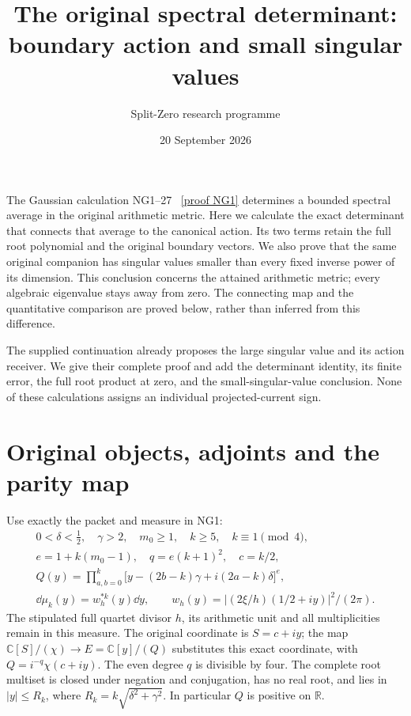 \documentclass[11pt]{article}
\title{The original spectral determinant:\\boundary action and small singular values}
\author{Split-Zero research programme}\date{20 September 2026}
\newcommand{\R}{\mathbb R}\newcommand{\C}{\mathbb C}
\begin{document}
\maketitle

The Gaussian calculation NG1--27 \cite{NG}%
~\href{https://github.com/KokunoYumeto/zeta-function-research-reader/blob/5992ad50c0f2a06921f1fcaded7b4e38097c0739/workbenches/splitzero-tandem/continuations/20260920-original-kernel-mixed-determinants/providers/GAUSSIAN_ARITHMETIC_RETURN.tex\#L31}{[proof NG1]}%
{} determines a bounded spectral
average in the original arithmetic metric. Here we calculate the exact
determinant that connects that average to the canonical action. Its two
terms retain the full root polynomial and the original boundary vectors.
We also prove that the same original companion has singular values smaller
than every fixed inverse power of its dimension. This conclusion concerns
the attained arithmetic metric; every algebraic eigenvalue stays away
from zero. The connecting map and the quantitative comparison are proved
below, rather than inferred from this difference.

The supplied continuation \cite[Section 5]{incoming} already proposes the
large singular value and its action receiver. We give their complete
proof and add the determinant identity, its finite error, the full root
product at zero, and the small-singular-value conclusion. None of these
calculations assigns an individual projected-current sign.

\section{Original objects, adjoints and the parity map}
Use exactly the packet and measure in NG1:
\begin{equation}\tag{SD1}
\begin{gathered}
0<\delta<\tfrac12,\quad\gamma>2,\quad m_0\ge1,\quad
k\ge5,\quad k\equiv1\pmod4,\\
e=1+k(m_0-1),\quad q=e(k+1)^2,\quad c=k/2,\\
Q(y)=\prod_{a,b=0}^k
\bigl[y-(2b-k)\gamma+i(2a-k)\delta\bigr]^e,\\
\dd\mu_k(y)=w_h^{*k}(y)\dd y,\qquad
w_h(y)=|(2\xi/h)(1/2+iy)|^2/(2\pi).
\end{gathered}
\end{equation}
The stipulated full quartet divisor $h$, its arithmetic unit and all
multiplicities remain in this measure. The original coordinate is
$S=c+iy$; the map $\C[S]/(\chi)\to E=\C[y]/(Q)$ substitutes this exact
coordinate, with $Q=i^{-q}\chi(c+iy)$. The even degree $q$ is divisible
by four. The complete root multiset is closed under negation and
conjugation, has no real root, and lies in $|y|\le R_k$, where
$R_k=k\sqrt{\delta^2+\gamma^2}$. In particular $Q$ is positive on $\R$.
\end{document}
